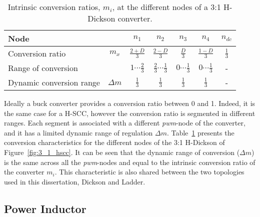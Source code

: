 \begin{table}[h]

\centering
\caption{Intrinsic conversion ratios, $m_i$, at the different nodes of a 3:1 H-Dickson converter.}
\label{tab:3:1 H-Dick_M}
\renewcommand{\arraystretch}{1.5}%
\begin{tabular}{l  c | c c c c c }
 Node &  & $n_1$ & $n_2$ & $n_3$ & $n_4$ & $n_{dc}$ \\
 \midrule
 Conversion ratio & $m_x$ & $\frac{2+D}{3} $    & $\frac{2-D}{3} $ & $\frac{D}{3} $ & $\frac{1-D}{3} $ & $\frac{1}{3}$ \\
 Range of conversion &       & $1 \cdots \frac{2}{3}$ & $\frac{2}{3} \cdots \frac{1}{3} $ & $0 \cdots \frac{1}{3}$ & $0 \cdots  \frac{1}{3} $ & - \\
 Dynamic conversion range & $\Delta m$ &  $\frac{1}{3}$ &  $\frac{1}{3}$ &  $\frac{1}{3}$ &  $\frac{1}{3}$ &  -
\end{tabular}
\end{table}

Ideally a buck converter provides a conversion ratio between 0 and 1. Indeed, it is the same case for a H-SCC, however the conversion ratio is segmented in different ranges. Each segment is associated with a different \emph{pwm}-node of the converter, and it has a limited dynamic range of regulation $\Delta m$. Table~\ref{tab:3:1 H-Dick_M} presents the conversion characteristics for the different nodes of the 3:1 H-Dickson of Figure~\ref{fig:3_1_hscc}. It can be seen that the dynamic range of conversion ($\Delta m$) is the same across all the \emph{pwm}-nodes and equal to the intrinsic conversion ratio of the converter $m_i$. This characteristic is also shared between the two topologies used in this dissertation, Dickson and Ladder.

\subsection{Power Inductor}
\label{ch:power_inductor}

